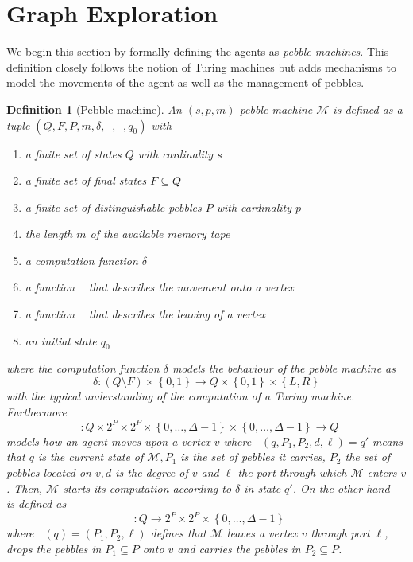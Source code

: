 \documentclass[oneside]{scrartcl}
\newtheorem{definition}{Definition}
\DeclareMathOperator{\din}{\delta_{\mathit{in}}}
\DeclareMathOperator{\dout}{\delta_{\mathit{out}}}
\begin{document}
\section{Graph Exploration}
We begin this section by formally defining the agents as
\emph{pebble machines}. This definition closely follows the notion of Turing
machines but adds mechanisms to model the movements of the agent as well as
the management of pebbles.
\begin{definition}[Pebble machine]
  An $(s,p,m)$-\emph{pebble machine} $\mathcal{M}$ is defined as a tuple
  $(Q,F,P,m,\delta,\din,\dout,q_{0})$ with
  \begin{enumerate}
    \item a finite set of states $Q$ with cardinality $s$
    \item a finite set of final states $F\subseteq Q$
    \item a finite set of distinguishable pebbles $P$ with cardinality $p$
    \item the length $m$ of the available memory tape
    \item a computation function $\delta$
    \item a function $\din$ that describes the movement onto a vertex
    \item a function $\dout$ that describes the leaving of a vertex
    \item an initial state $q_{0}$
  \end{enumerate}
  where the computation function $\delta$ models the behaviour of the pebble
  machine as
  \begin{equation*}
    \delta\colon (Q\setminus F)\times\left\{0,1\right\}\rightarrow
    Q\times\left\{0,1\right\}\times\left\{L,R\right\}
  \end{equation*}
  with the typical understanding of the computation of a Turing machine.
  Furthermore
  \begin{equation*}
    \din\colon Q\times 2^{P}\times 2^{P}\times
    \left\{0,\dots,\Delta - 1\right\}\times\left\{0,\dots,\Delta - 1\right\}
    \rightarrow Q
  \end{equation*}
  models how an agent moves upon a vertex $v$ where
  $\din(q,P_{1},P_{2},d,\ell) = q'$ means that $q$ is the current state of
  $\mathcal{M}, P_{1}$ is the set of pebbles it carries, $P_{2}$ the set
  of pebbles located on $v, d$ is the degree of $v$ and $\ell$ the port
  through which $\mathcal{M}$ enters $v$. Then, $\mathcal{M}$ starts its
  computation according to $\delta$ in state $q'$.  On the other hand $\dout$
  is defined as
  \begin{equation*}
    \dout\colon Q
    \rightarrow 2^{P}\times 2^{P}\times \left\{0,\dots,\Delta - 1\right\}
  \end{equation*}
  where $\dout(q) = (P_{1}, P_{2}, \ell)$ defines that $\mathcal{M}$ leaves
  a vertex $v$ through port $\ell$, drops the pebbles in $P_{1}\subseteq P$
  onto $v$ and carries the pebbles in $P_{2}\subseteq P$.


\end{definition}
\end{document}

